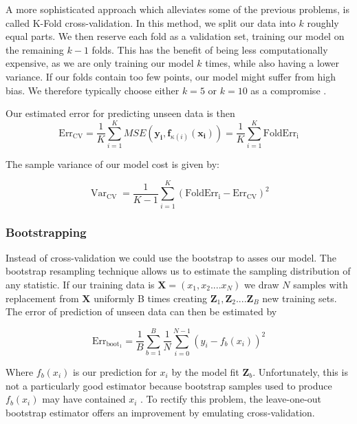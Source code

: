 \documentclass{article}
\DeclareMathOperator*{\Var}{Var}
\begin{document}
A more sophisticated approach which alleviates some of the previous problems, is called K-Fold cross-validation. In this method, we split our data into $k$ roughly equal parts. We then reserve each fold as a validation set, training our model on the remaining $k-1$ folds. This has the benefit of being less computationally expensive, as we are only training our model $k$ times, while also having a lower variance. If our folds contain too few points, our model might suffer from high bias. We therefore typically choose either $k = 5$ or $k = 10$ as a compromise \cite[p.~243]{Hastie2009}.

Our estimated error for predicting unseen data is then
\begin{equation*}
    \text{Err}_{\text{CV}}= \frac{1}{K} \sum_{i=1}^{K}
    MSE(\boldsymbol{y_i},\boldsymbol{f}_{\kappa(i)}(\boldsymbol{x_i})) = \frac{1}{K} \sum_{i=1}^{K} \text{FoldErr}_{\text{i}}
\end{equation*}

The sample variance of our model cost is given by:

\begin{equation*} \Var_{\text{CV}} = \frac{1}{K - 1} \sum_{i=1}^{K}( \text{FoldErr}_{\text{i}} - \text{Err}_{\text{CV}})^2
\end{equation*}



\subsubsection{Bootstrapping}
Instead of cross-validation we could use the bootstrap to asses our model. The bootstrap resampling technique allows us to estimate the sampling distribution of any statistic. If our training data is $\textbf{X} = (x_1, x_2 .... x_N)$ we draw $N$ samples with replacement from $\textbf{X}$ uniformly B times creating $\boldsymbol{Z}_1, \boldsymbol{Z}_2 .... \boldsymbol{Z}_B$ new training sets. The error of prediction of unseen data can then be estimated by 

\begin{equation*}
    \text{Err}_{\text{boot}_1} =  \frac{1}{B} \sum_{b=1}^B \frac{1}{N} \sum_{i = 0}^{N-1} (y_i - f_b(x_i))^2
\end{equation*}

Where $f_b(x_i)$ is our prediction for $x_i$ by the model fit $\boldsymbol{Z}_b$. Unfortunately, this is not a particularly good estimator because bootstrap samples used to produce $f_b(x_i)$ may have contained $x_i$ \cite[p.~270]{Hastie2009}. To rectify this problem, the leave-one-out bootstrap estimator offers an improvement by emulating cross-validation.
\end{document}
